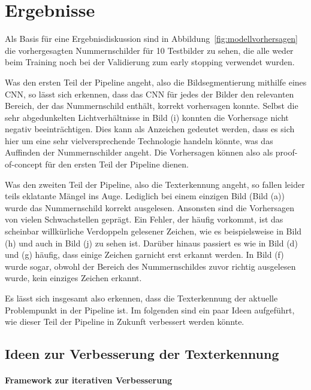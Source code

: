 \section{Ergebnisse}
\label{sec:ergebnisse}

Als Basis f\"ur eine Ergebnisdiskussion sind in
Abbildung~\ref{fig:modellvorhersagen} die vorhergesagten Nummernschilder
f\"ur 10 Testbilder zu sehen, die alle weder beim Training noch bei der
Validierung zum early stopping verwendet wurden.

Was den ersten Teil der Pipeline angeht, also die Bildsegmentierung
mithilfe eines CNN, so l\"asst sich erkennen, dass das CNN f\"ur jedes
der Bilder den relevanten Bereich, der das Nummernschild enth\"alt,
korrekt vorhersagen konnte.
Selbst die sehr abgedunkelten Lichtverh\"altnisse in Bild (i) konnten
die Vorhersage nicht negativ beeintr\"achtigen.
Dies kann als Anzeichen gedeutet werden, dass es sich hier um eine
sehr vielversprechende Technologie handeln k\"onnte, was das Auffinden
der Nummernschilder angeht.
Die Vorhersagen k\"onnen also als proof-of-concept f\"ur den ersten
Teil der Pipeline dienen.

Was den zweiten Teil der Pipeline, also die Texterkennung angeht, so
fallen leider teils eklatante M\"angel ins Auge.
Lediglich bei einem einzigen Bild (Bild (a)) wurde das Nummernschild
korrekt ausgelesen. Ansonsten sind die Vorhersagen von vielen
Schwachstellen gepr\"agt.
Ein Fehler, der h\"aufig vorkommt, ist das scheinbar
willk\"urliche Verdoppeln gelesener Zeichen, wie es beispielsweise
in Bild (h) und auch in Bild (j) zu sehen ist.
Dar\"uber hinaus passiert es wie in Bild (d) und (g) h\"aufig, dass
einige Zeichen garnicht erst erkannt werden.
In Bild (f) wurde sogar, obwohl der Bereich des Nummernschildes zuvor
richtig ausgelesen wurde, kein einziges Zeichen erkannt.

Es l\"asst sich insgesamt also erkennen, dass die Texterkennung
der aktuelle Problempunkt in der Pipeline ist.
Im folgenden sind ein paar Ideen aufgef\"uhrt, wie dieser Teil
der Pipeline in Zukunft verbessert werden k\"onnte.

\subsection{Ideen zur Verbesserung der Texterkennung}

\paragraph{Framework zur iterativen Verbesserung}

